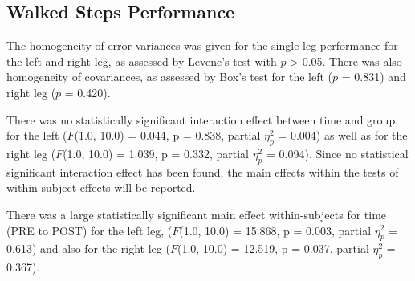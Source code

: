 \subsection{Walked Steps Performance}
The homogeneity of error variances was given for the single leg performance for the left and right leg, as assessed by Levene's test with $p$ > 0.05.
There was also homogeneity of covariances, as assessed by Box's test for the left ($p$ = 0.831) and right leg ($p$ = 0.420).

There was no statistically significant interaction effect between time and group, for the left ($F$(1.0, 10.0) = 0.044, p = 0.838, partial $\eta_{p}^{2}$ = 0.004) as well as for the right leg ($F$(1.0, 10.0) = 1.039, p = 0.332, partial $\eta_{p}^{2}$ = 0.094).
Since no statistical significant interaction effect has been found, the main effects within the tests of within-subject effects will be reported.

There was a large statistically significant main effect within-subjects for time (PRE to POST) for the left leg, ($F$(1.0, 10.0) = 15.868, p = 0.003, partial $\eta_{p}^{2}$ = 0.613) and also for the right leg ($F$(1.0, 10.0) = 12.519, p = 0.037, partial $\eta_{p}^{2}$ = 0.367).

